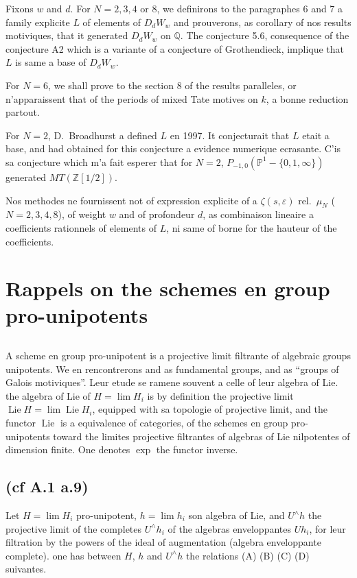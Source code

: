 \documentclass[11pt,a4paper]{article}
\theoremstyle{plain}
\theoremstyle{definition}
\DeclareMathOperator{\Lie}{Lie}
\newcommand{\Q}{\mathbb{Q}}
\newcommand{\Z}{\mathbb{Z}}
\newcommand{\Pone}{\mathbb{P}^1}
\begin{document}
Fixons $w$ and $d$. For $N = 2,3,4$ or $8$, we definirons to the paragraphes 6 and 7 a family explicite $L$ of elements of $D_d W_w$ and prouverons, as corollary of nos results motiviques, that it generated $D_d W_w$ on $\Q$. The conjecture 5.6, consequence of the conjecture A2 which is a variante of a conjecture of Grothendieck, implique that $L$ is same a base of $D_d W_w$.

For $N=6$, we shall prove to the section 8 of the results paralleles, or n'apparaissent that of the periods of mixed Tate motives on $k$, a bonne reduction partout.

For $N=2$, D.~Broadhurst a defined $L$ en 1997. It conjecturait that $L$ etait a base, and had obtained for this conjecture a evidence numerique ecrasante. C'is sa conjecture which m'a fait esperer that for $N=2$, $P_{-1,0}(\Pone - \{0,1,\infty\})$ generated $MT(\Z[1/2])$.

Nos methodes ne fournissent not of expression explicite of a $\zeta(s,\varepsilon)$ rel.~$\mu_N$ ($N=2,3,4,8$), of weight $w$ and of profondeur $d$, as combinaison lineaire a coefficients rationnels of elements of $L$, ni same of borne for the hauteur of the coefficients.

\section{Rappels on the schemes en group pro-unipotents}
\label{sec:1}

\subsection{}
A scheme en group pro-unipotent is a projective limit filtrante of algebraic groups unipotents. We en rencontrerons and as fundamental groups, and as ``groups of Galois motiviques''. Leur etude se ramene souvent a celle of leur algebra of Lie. the algebra of Lie of $H = \lim H_i$ is by definition the projective limit $\Lie H = \lim \Lie H_i$, equipped with sa topologie of projective limit, and the functor $\Lie$ is a equivalence of categories, of the schemes en group pro-unipotents toward the limites projective filtrantes of algebras of Lie nilpotentes of dimension finite. One denotes $\exp$ the functor inverse.

\subsection{(cf \cite{1} A.1 a.9)}
Let $H = \lim H_i$ pro-unipotent, $h = \lim h_i$ son algebra of Lie, and $U^{\wedge}h$ the projective limit of the completes $U^{\wedge}h_i$ of the algebras enveloppantes $Uh_i$, for leur filtration by the powers of the ideal of augmentation (algebra enveloppante complete). one has between $H$, $h$ and $U^{\wedge}h$ the relations (A) (B) (C) (D) suivantes.
\end{document}
